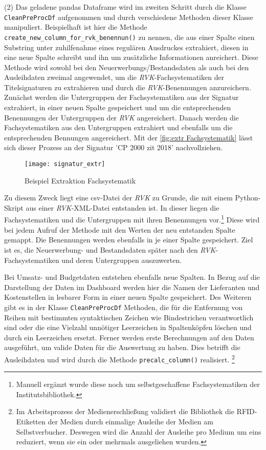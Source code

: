     (2) Das geladene pandas Dataframe wird im zweiten Schritt durch die Klasse \texttt{CleanPreProcDf} aufgenommen und durch verschiedene Methoden dieser Klasse
    manipuliert. Beispielhaft ist hier die Methode \texttt{create\_new\_column\_for\_rvk\_benennun()} zu nennen, die aus einer Spalte einen Substring unter
    zuhilfenahme eines regulären Ausdruckes extrahiert, diesen in eine neue Spalte schreibt und ihn um zusätzliche Informationen anreichert. 
    Diese Methode wird sowohl bei den Neuerwerbungs/Bestandsdaten als auch bei den Ausleihdaten zweimal angewendet, um die  \textit{\acrshort{RVK}}-Fachsystematiken der
    Titelsignaturen zu extrahieren und durch die \textit{\acrshort{RVK}}-Benennungen anzureichern. 
    Zunächst werden die Untergruppen der Fachsystematiken aus der Signatur extrahiert, in einer neuen Spalte gespeichert und um die entsprechenden Benennungen der Untergruppen der 
    \textit{\acrshort{RVK}} angereichert. 
    Danach werden die Fachsystematiken aus den Untergruppen extrahiert und ebenfalls um die entsprechenden Bennungen angereichert.
    Mit der \autoref{fig:extr Fachsystematik} lässt sich dieser Prozess an der Signatur 'CP 2000 zit 2018' nachvollziehen.
    \begin{figure}[H]
        \centering
            \texttt{[image: signatur\_extr]}
            \caption{Beispiel Extraktion Fachsystematik}
            \label{fig:extr Fachsystematik}
    \end{figure}

    Zu diesem Zweck liegt eine csv-Datei der \textit{\acrshort{RVK}} zu Grunde, die mit einem Python-Skript aus einer \textit{\acrshort{RVK}}-XML-Datei\cite[Vgl.][]{rvk_rvk_2021} entstanden ist.
    In dieser liegen die Fachsystematiken und die Untergruppen mit ihren Benennungen vor.\footnote{Manuell ergänzt wurde diese noch um selbstgeschaffene Fachsystematiken der Institutsbibliothek.}
    Diese wird bei jedem Aufruf der Methode mit den Werten der neu entstanden Spalte gemappt. Die Benennungen werden ebenfalls in je einer Spalte gespeichert.
    Ziel ist es, die Neuerwerbung- und Bestandsdaten später nach den \textit{\acrshort{RVK}}-Fachsystematiken und deren Untergruppen auszuwerten.
    
    
    Bei Umsatz- und Budgetdaten entstehen ebenfalls neue Spalten. In Bezug auf die Darstellung der Daten im Dashboard werden
    hier die Namen der Lieferanten und Kostenstellen in lesbarer Form in einer neuen Spalte gespeichert. 
    Des Weiteren gibt es in der Klasse \texttt{CleanPreProcDf} Methoden, die für die Entfernung von Reihen mit bestimmten syntaktischen Zeichen wie Bindestrichen 
    verantwortlich sind oder die eine Vielzahl unnötiger Leerzeichen in Spaltenköpfen löschen  und durch ein Leerzeichen ersetzt.
    Ferner werden erste Berechnungen auf den Daten ausgeführt, um valide Daten für die Auswertung zu haben. Dies betrifft die Ausleihdaten und wird durch die
    Methode \texttt{precalc\_column()} realisiert.
    \footnote{Im Arbeitsprozess der Medienerschließung validiert die Bibliothek die RFID-Etiketten der Medien durch einmalige Ausleihe der Medien am Selbstverbucher.
    Deswegen wird die Anzahl der Ausleihe pro Medium um eins reduziert, wenn sie ein oder mehrmals ausgeliehen wurden.}
     
